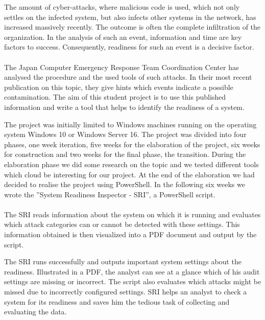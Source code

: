\thispagestyle{plain}
\renewcommand\section{\stdsection}
\thispagestyle{plain}
The amount of cyber-attacks, where malicious code is used, which not only settles on the infected system, but also infects other systems in the network, has increased massively recently. The outcome is often the complete infiltration of the organization. In the analysis of such an event, information and time are key factors to success. Consequently, readiness for such an event is a decisive factor. \\\\
The Japan Computer Emergency Response Team Coordination Center has analysed the procedure and the used tools of such attacks. In their most recent publication on this topic, they give hints which events indicate a possible contamination. The aim of this student project is to use this published information and write a tool that helps to identify the readiness of a system.

\thispagestyle{plain}
The project was initially limited to Windows machines running on the operating system Windows 10 or Windows Server 16. The project was divided into four phases, one week iteration, five weeks for the elaboration of the project, six weeks for construction and two weeks for the final phase, the transition. During the elaboration phase we did some research on the topic and we tested different tools which cloud be interesting for our project. At the end of the elaboration we had decided to realise the project using PowerShell. In the following six weeks we wrote the ''System Readiness Inspector - SRI'', a PowerShell script. \\\\
The SRI reads information about the system on which it is running and evaluates which attack categories can or cannot be detected with these settings. This information obtained is then visualized into a PDF document and output by the script.

\thispagestyle{plain}
The SRI runs successfully and outputs important system settings about the readiness. Illustrated in a PDF, the analyst can see at a glance which of his audit settings are missing or incorrect. The script also evaluates which attacks might be missed due to incorrectly configured settings. SRI helps an analyst to check a system for its readiness and saves him the tedious task of collecting and evaluating the data.

